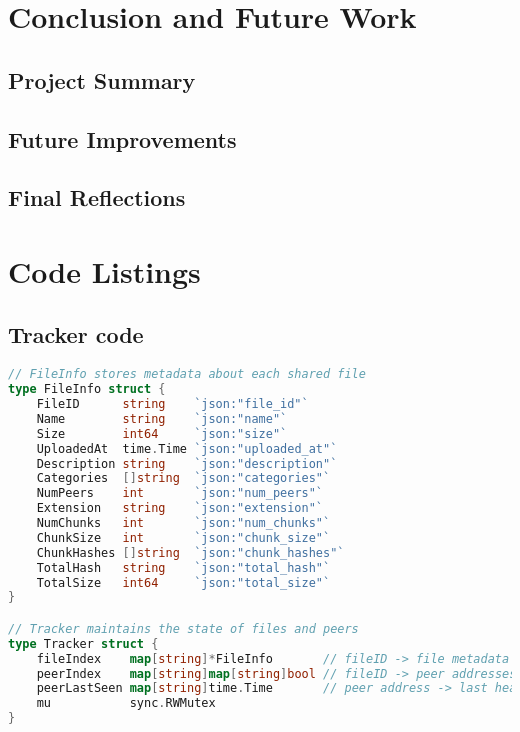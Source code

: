 \documentclass[12pt,a4paper]{report}
\begin{document}
\chapter{Conclusion and Future Work}
\section{Project Summary}

\section{Future Improvements}

\section{Final Reflections}

\appendix
\chapter{Code Listings}

\section{Tracker code}
\begin{lstlisting}[language=Go, caption={TCP transport implementation}, label={lst:tracker-code}]
// FileInfo stores metadata about each shared file
type FileInfo struct {
    FileID      string    `json:"file_id"`
    Name        string    `json:"name"`
    Size        int64     `json:"size"`
    UploadedAt  time.Time `json:"uploaded_at"`
    Description string    `json:"description"`
    Categories  []string  `json:"categories"`
    NumPeers    int       `json:"num_peers"`
    Extension   string    `json:"extension"`
    NumChunks   int       `json:"num_chunks"`
    ChunkSize   int       `json:"chunk_size"`
    ChunkHashes []string  `json:"chunk_hashes"`
    TotalHash   string    `json:"total_hash"`
    TotalSize   int64     `json:"total_size"`
}

// Tracker maintains the state of files and peers
type Tracker struct {
    fileIndex    map[string]*FileInfo       // fileID -> file metadata
    peerIndex    map[string]map[string]bool // fileID -> peer addresses
    peerLastSeen map[string]time.Time       // peer address -> last heartbeat
    mu           sync.RWMutex
}
\end{lstlisting}
\end{document}
